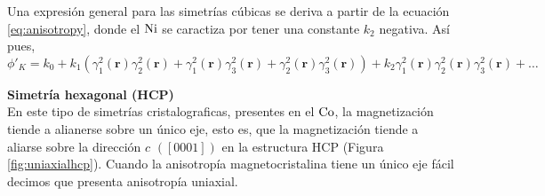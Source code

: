 Una expresión general para las simetrías cúbicas se deriva a partir de la ecuación \ref{eq:anisotropy}, donde el $\ce{Ni}$ se caractiza por tener una constante $k_2$ negativa. Así pues, \[ \phi'_K = k_0 + k_1 (\gamma_1^2 (\mathbf{r})\gamma_2^2 (\mathbf{r})+\gamma_1^2 (\mathbf{r})\gamma_3^2 (\mathbf{r}) +\gamma_2^2 (\mathbf{r})\gamma_3^2 (\mathbf{r})) + k_2 \gamma_1^2 (\mathbf{r})\gamma_2^2 (\mathbf{r}) \gamma_3^2 (\mathbf{r}) + \dotsc \]

\vspace{10pt}

\textbf{Simetría hexagonal (HCP)}\\
En este tipo de simetrías cristalograficas, presentes en el $\ce{Co}$, la magnetización tiende a alianerse sobre un único eje, esto es, que la magnetización tiende a aliarse sobre la dirección $c$ $([0001])$ en la estructura HCP (Figura \ref{fig:uniaxialhcp}). Cuando la anisotropía magnetocristalina tiene un único eje fácil decimos que presenta anisotropía uniaxial.

